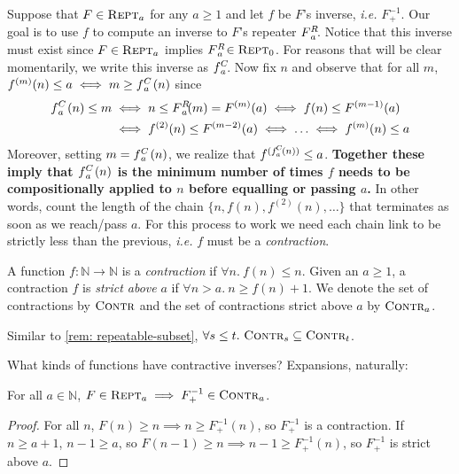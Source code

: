 Suppose that $F \in \text{\scshape{Rept}}_a$ for any $a \ge 1$ and let $f$ be $F$'s inverse, \emph{i.e.} $F^{-1}_{+}$.  Our goal is to use $f$ to compute an inverse to $F$'s repeater $\rf{F}{a}$.  Notice that this inverse must exist since $F \in \text{\scshape{Rept}}_a$ implies $\rf{F}{a} \in \repeatable_0$.  
For reasons that will be clear momentarily, we write this inverse as $\cdt{f}{a}$.  Now
fix $n$ and observe that for all $m$, $f^{(m)}(n)\le a \iff m \ge \cdt{f}{a}(n)$ since
\begin{equation} \label{eq: rf-upp-inv}
\begin{aligned}
\cdt{f}{a}(n)\le m & \iff n\le \rf{F}{a}(m) = F^{(m)}(a) \iff f(n)\le F^{(m-1)}(a) \\
& \iff f^{(2)}(n)\le F^{(m-2)}(a) \iff \ldots \iff f^{(m)}(n)\le a
\end{aligned}
\end{equation}
Moreover, setting $m = \cdt{f}{a}(n)$, we realize that $f^{(\cdt{f}{a}(n))}\le a$.  
\textbf{Together these imply that $\cdt{f}{a}(n)$ is the minimum number of times $f$ 
needs to be compositionally applied to $n$ before equalling or passing $a$.} 
In other words, count the length of the chain $\{n, f(n), f^{(2)}(n), \ldots\}$ that 
terminates as soon as we reach/pass $a$.  For this process to work we need each chain link
to be strictly less than the previous, \emph{i.e.} $f$ must be a \emph{contraction}.
\begin{defn} \label{defn: contracting}
	A function $f : \mathbb{N} \to \mathbb{N}$ is a \textit{contraction} if $\forall n.~ f(n) \le n$. Given an $a \ge 1$, a contraction $f$ is \textit{strict above} $a$ if $\forall n > a.~ n\ge f(n)+1$. We denote the set of contractions by $\text{\scshape{Contr}}$ and the set of contractions strict above $a$ by $\text{\scshape{Contr}}_a$.
\end{defn}
\begin{rem}
	Similar to \cref{rem: repeatable-subset}, $\forall s\le t.~ \text{\scshape{Contr}}_s \subseteq \text{\scshape{Contr}}_t$.
\end{rem}
What kinds of functions have contractive inverses? Expansions, naturally:
\begin{thm} \label{thm: expansion-inv-contraction}
For all $a\in \mathbb{N}$, $F\in \text{\scshape{Rept}}_a \implies F^{-1}_+ \in \text{\scshape{Contr}}_a$.
\end{thm}
\begin{proof}
For all $n$, $F(n)\ge n \implies n \ge F^{-1}_+(n)$, so $F^{-1}_+$ is a contraction. If $n\ge a+1$, $n-1\ge a$, so $F(n-1)\ge n \implies n-1\ge F^{-1}_+(n)$, so $F^{-1}_+$ is strict above $a$.
\end{proof}
